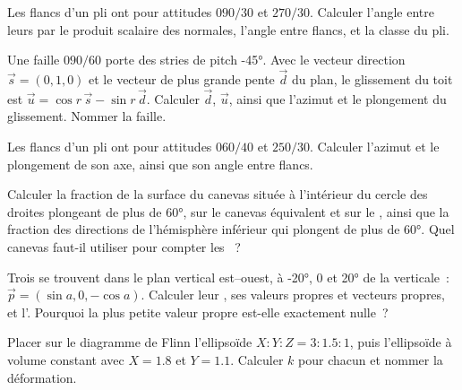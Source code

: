 \begin{exercise}[$\star$]\label{exo:b3:structural-analysis:3}
Les flancs d'un pli ont pour attitudes $090/30$ et $270/30$. Calculer
l'angle entre leurs  par le produit scalaire des normales, l'angle entre flancs,
et la classe du pli.
\end{exercise}

\begin{exercise}[$\star$]\label{exo:b3:structural-analysis:4}
Une faille $090/60$ porte des stries de pitch \ang{-45}. Avec le vecteur direction
$\vec s = (0, 1, 0)$ et le vecteur de plus grande pente $\vec d$ du plan, le glissement
du toit est $\vec u = \cos r\,\vec s - \sin r\,\vec d$. Calculer
$\vec d$, $\vec u$, ainsi que l'azimut et le plongement du glissement. Nommer la faille.
\end{exercise}

\begin{exercise}[$\star\star$]\label{exo:b3:structural-analysis:5}
Les flancs d'un pli ont pour attitudes $060/40$ et $250/30$. Calculer l'azimut
et le plongement de son axe, ainsi que son angle entre flancs.
\end{exercise}

\begin{exercise}[$\star\star$]\label{exo:b3:structural-analysis:6}
Calculer la fraction de la surface du canevas située à l'intérieur du cercle des
droites plongeant de plus de \ang{60}, sur le canevas équivalent et sur le , ainsi que la fraction des directions de l'hémisphère inférieur qui plongent
de plus de \ang{60}. Quel canevas faut-il utiliser pour compter les ~?
\end{exercise}

\begin{exercise}[$\star\star$]\label{exo:b3:structural-analysis:7}
Trois  se trouvent dans le plan vertical est--ouest, à \ang{-20}, $0$ et
\ang{20} de la verticale~: $\vec p = (\sin a, 0, -\cos a)$. Calculer leur , ses valeurs propres et vecteurs propres, et l'. Pourquoi
la plus petite valeur propre est-elle exactement nulle~?
\end{exercise}

\begin{exercise}[$\star\star$]\label{exo:b3:structural-analysis:8}
Placer sur le diagramme de Flinn l'ellipsoïde $X : Y : Z = 3 : 1.5 : 1$, puis l'ellipsoïde
à volume constant avec $X = 1.8$ et $Y = 1.1$. Calculer $k$ pour
chacun et nommer la déformation.
\end{exercise}

